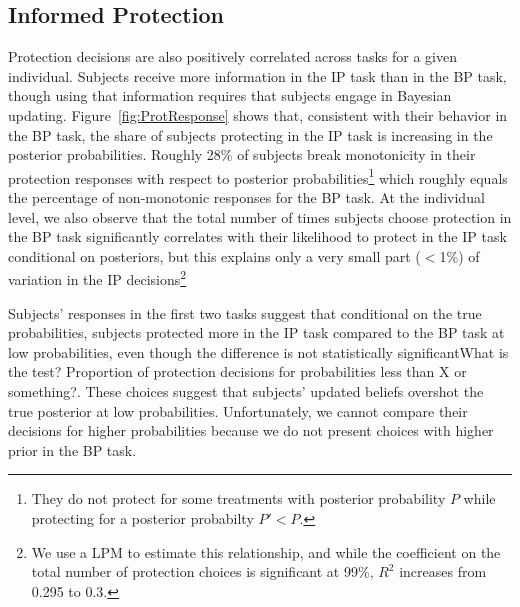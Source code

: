\documentclass[12pt,a4paper]{article}
\newcommand{\aut}[1]{{\color{Red}#1}}
\newcommand{\pmt}[1]{{\color{Blue}#1}}
\begin{document}
\subsection{Informed Protection}
Protection decisions are also positively correlated across tasks for a given individual.
Subjects receive more information in the IP task than in the BP task, though using that information requires that subjects engage in Bayesian updating.  Figure~\ref{fig:ProtResponse} shows that, consistent with their behavior in the BP task, the share of subjects protecting in the IP task is increasing in the posterior probabilities. Roughly 28\% of subjects break monotonicity in their protection responses with respect to posterior probabilities\footnote{ They do not protect for some treatments with posterior probability $P$ while protecting for a posterior probabilty $P'<P$.} which roughly equals the percentage of non-monotonic responses for the BP task. At the individual level, we also observe that the total number of times subjects choose protection in the BP task significantly correlates with their likelihood to protect in the IP task conditional on posteriors, but this explains only a very small part ($<$1\%) of variation in the IP decisions\footnote{We use a LPM to estimate this relationship, and while the coefficient on the total number of protection choices is significant at 99\%, $R^2$ increases from 0.295 to 0.3.} 

Subjects' responses in the first two tasks suggest that conditional on the true probabilities, subjects protected more in the IP task compared to the BP task at low probabilities, \aut{even though the difference is not statistically significant}\pmt{What is the test? Proportion of protection decisions for probabilities less than X or something?}. These choices suggest that subjects’ updated beliefs overshot the true posterior at low probabilities.  Unfortunately, we cannot compare their decisions for higher probabilities because we do not present choices with higher prior in the BP task.

\end{document}
